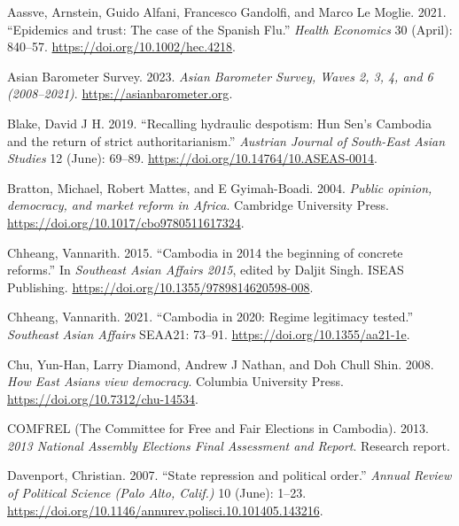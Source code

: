 \documentclass[Review,times,sageh,doublespace]{sagej}
\newlength{\cslhangindent}
\newenvironment{CSLReferences}[2] %
 {\begin{list}{}{%
  \setlength{\itemindent}{0pt}
  \setlength{\leftmargin}{0pt}
  \setlength{\parsep}{0pt}
  \ifodd #1
   \setlength{\leftmargin}{\cslhangindent}
   \setlength{\itemindent}{-1\cslhangindent}
  \fi
  \setlength{\itemsep}{#2\baselineskip}}}
 {\end{list}}
\begin{document}
\label{refs}
\begin{CSLReferences}{1}{1}
Aassve, Arnstein, Guido Alfani, Francesco Gandolfi, and Marco Le Moglie.
2021. {``{Epidemics and trust: The case of the Spanish Flu}.''}
\emph{Health Economics} 30 (April): 840--57.
\url{https://doi.org/10.1002/hec.4218}.

Asian Barometer Survey. 2023. \emph{{Asian Barometer Survey, Waves 2, 3,
4, and 6 (2008--2021)}}. \url{https://asianbarometer.org}.

Blake, David J H. 2019. {``{Recalling hydraulic despotism: Hun Sen's
Cambodia and the return of strict authoritarianism}.''} \emph{Austrian
Journal of South-East Asian Studies} 12 (June): 69--89.
\url{https://doi.org/10.14764/10.ASEAS-0014}.

Bratton, Michael, Robert Mattes, and E Gyimah-Boadi. 2004. \emph{{Public
opinion, democracy, and market reform in Africa}}. Cambridge University
Press. \url{https://doi.org/10.1017/cbo9780511617324}.

Chheang, Vannarith. 2015. {``{Cambodia in 2014 the beginning of concrete
reforms}.''} In \emph{{Southeast Asian Affairs 2015}}, edited by Daljit
Singh. ISEAS Publishing.
\url{https://doi.org/10.1355/9789814620598-008}.

Chheang, Vannarith. 2021. {``{Cambodia in 2020: Regime legitimacy
tested}.''} \emph{Southeast Asian Affairs} SEAA21: 73--91.
\url{https://doi.org/10.1355/aa21-1e}.

Chu, Yun-Han, Larry Diamond, Andrew J Nathan, and Doh Chull Shin. 2008.
\emph{{How East Asians view democracy}}. Columbia University Press.
\url{https://doi.org/10.7312/chu-14534}.

COMFREL (The Committee for Free and Fair Elections in Cambodia). 2013.
\emph{{2013 National Assembly Elections Final Assessment and Report}}.
Research report.

Davenport, Christian. 2007. {``{State repression and political
order}.''} \emph{Annual Review of Political Science (Palo Alto, Calif.)}
10 (June): 1--23.
\url{https://doi.org/10.1146/annurev.polisci.10.101405.143216}.


\end{CSLReferences}
\end{document}
